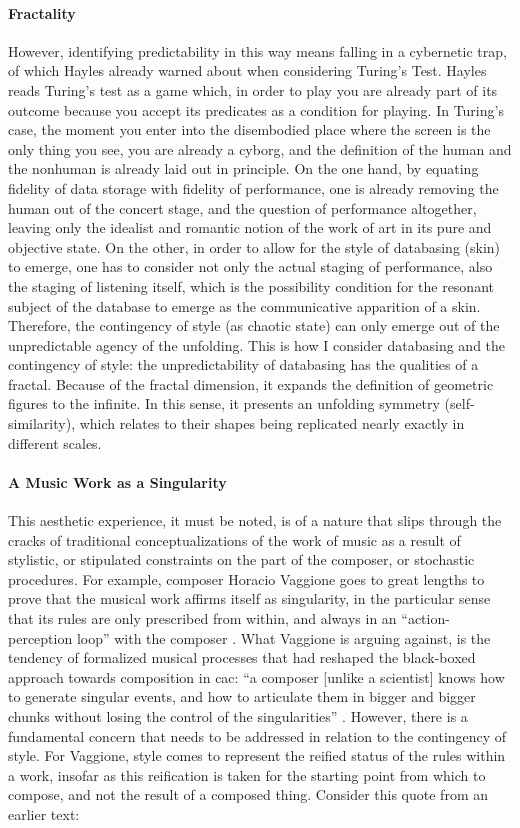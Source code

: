 \paragraph{Fractality}
However, identifying predictability in this way means falling in a cybernetic trap, of which Hayles already warned about when considering Turing's Test. Hayles reads Turing's test as a game which, in order to play you are already part of its outcome because you accept its predicates as a condition for playing. In Turing's case, the moment you enter into the disembodied place where the screen is the only thing you see, you are already a cyborg, and the definition of the human and the nonhuman is already laid out in principle. On the one hand, by equating fidelity of data storage with fidelity of performance, one is already removing the human out of the concert stage, and the question of performance altogether, leaving only the idealist and romantic notion of the work of art in its pure and objective state. On the other, in order to allow for the style of databasing (skin) to emerge, one has to consider not only the actual staging of performance, also the staging of listening itself, which is the possibility condition for the resonant subject of the database to emerge as the communicative apparition of a skin. Therefore, the contingency of style (as chaotic state) can only emerge out of the unpredictable agency of the unfolding. This is how I consider databasing and the contingency of style: the unpredictability of databasing has the qualities of a fractal. Because of the fractal dimension, it expands the definition of geometric figures to the infinite. In this sense, it presents an unfolding symmetry (self-similarity), which relates to their shapes being replicated nearly exactly in different scales. 

\paragraph{A Music Work as a Singularity}
This aesthetic experience, it must be noted, is of a nature that slips through the cracks of traditional conceptualizations of the work of music as a result of stylistic, or stipulated constraints on the part of the composer, or stochastic procedures. For example, composer Horacio Vaggione goes to great lengths to prove that the musical work affirms itself as singularity, in the particular sense that its rules are only prescribed from within, and always in an ``action-perception loop'' with the composer \parencite{Vag01:Som}. What Vaggione is arguing against, is the tendency of formalized musical processes that had reshaped the black-boxed approach towards composition in \gls{cac}: ``a composer [unlike a scientist] knows how to generate singular events, and how to articulate them in bigger and bigger chunks without losing the control of the singularities'' \parencite[97]{Vag93:Det}. However, there is a fundamental concern that needs to be addressed in relation to the contingency of style. For Vaggione, style comes to represent the reified status of the rules within a work, insofar as this reification is taken for the starting point from which to compose, and not the result of a composed thing. Consider this quote from an earlier text:

